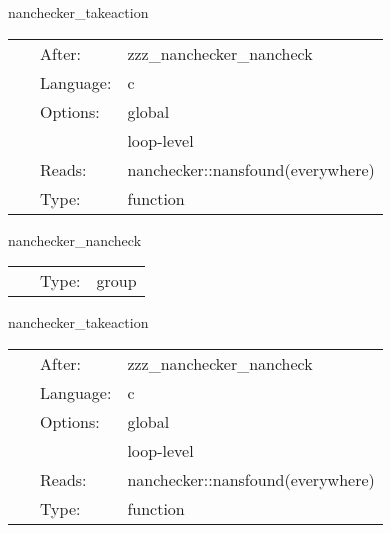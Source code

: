 \documentclass{article}
\begin{document}
\vspace{5mm}


\hspace{5mm} nanchecker\_takeaction 

\hspace{5mm}{\it output nanchecker::nanmask and take action according to nanchecker::action\_if\_found } 


\hspace{5mm}

 \begin{tabular*}{160mm}{cll} 
~ & After:  & zzz\_nanchecker\_nancheck \\ 
~ & Language:  & c \\ 
~ & Options:  & global \\ 
~& ~ &loop-level\\ 
~ & Reads:  & nanchecker::nansfound(everywhere) \\ 
~ & Type:  & function \\ 
\end{tabular*} 


\vspace{5mm}


\hspace{5mm} nanchecker\_nancheck 

\hspace{5mm}{\it check for nans and count them in nanchecker::nansfound } 


\hspace{5mm}

 \begin{tabular*}{160mm}{cll} 
~ & Type:  & group \\ 
\end{tabular*} 


\vspace{5mm}


\hspace{5mm} nanchecker\_takeaction 

\hspace{5mm}{\it output nanchecker::nanmask and take action according to nanchecker::action\_if\_found } 


\hspace{5mm}

 \begin{tabular*}{160mm}{cll} 
~ & After:  & zzz\_nanchecker\_nancheck \\ 
~ & Language:  & c \\ 
~ & Options:  & global \\ 
~& ~ &loop-level\\ 
~ & Reads:  & nanchecker::nansfound(everywhere) \\ 
~ & Type:  & function \\ 
\end{tabular*} 
\end{document}
